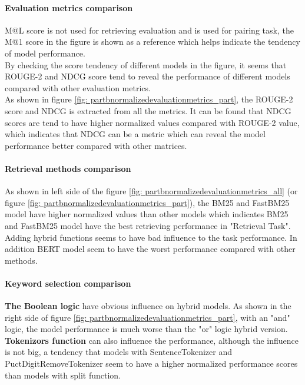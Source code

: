 \paragraph{Evaluation metrics comparison}

M@L score is not used for retrieving evaluation and is used for pairing task, the M@1 score in the figure is shown as a reference which helps indicate the tendency of model performance.\\

By checking the score tendency of different models in the figure, it seems that ROUGE-2 and NDCG score tend to reveal the performance of different models compared with other evaluation metrics.\\

As shown in figure \ref{fig: partbnormalizedevaluationmetrics_part}, the ROUGE-2 score and NDCG is extracted from all the metrics.
It can be found that NDCG scores are tend to have higher normalized values compared with ROUGE-2 value, which indicates that NDCG can be a metric which can reveal the model performance better compared with other matrices.

\paragraph{Retrieval methods comparison}

As shown in left side of the figure \ref{fig: partbnormalizedevaluationmetrics_all} (or figure \ref{fig: partbnormalizedevaluationmetrics_part}), the BM25 and FastBM25 model have higher normalized values than other models which indicates BM25 and FastBM25 model have the best retrieving performance in "Retrieval Task". Adding hybrid functions seems to have bad influence to the task performance. In addition BERT model seem to have the worst performance compared with other methods.

\paragraph{Keyword selection comparison}

\textbf{The Boolean logic} have obvious influence on hybrid models. As shown in the right side of figure \ref{fig: partbnormalizedevaluationmetrics_part}, with an "and" logic, the model performance is much worse than the "or" logic hybrid version.\\

\textbf{Tokenizors function} can also influence the performance, although the influence is not big, a tendency that models with SentenceTokenizer and  PuctDigitRemoveTokenizer seem to have a higher normalized performance scores than models with split function.

